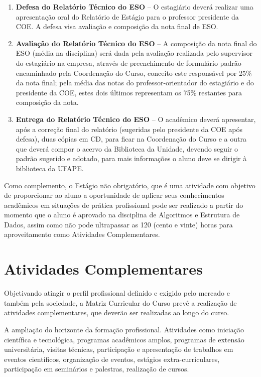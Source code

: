 \documentclass[
	12pt,				%
	openright,			%
  oneside,     %
	a4paper,			%
	english,			%
	french,				%
	spanish,			%
	brazil				%
	]{abntex2}
\begin{document}
\begin{enumerate}
    \item \textbf{Defesa do Relatório Técnico do ESO} – O estagiário deverá realizar uma apresentação oral do Relatório de Estágio para o professor presidente da COE. A defesa visa avaliação e composição da nota final de ESO.
    \item \textbf{Avaliação do Relatório Técnico do ESO} – A composição da nota final do ESO (média na disciplina) será dada pela avaliação realizada pelo supervisor do estagiário na empresa, através de preenchimento de formulário padrão encaminhado pela Coordenação do Curso, conceito este responsável por 25\% da nota final; pela média das notas do professor-orientador do estagiário e do presidente da COE, estes dois últimos representam os 75\% restantes para composição da nota.
    \item \textbf{Entrega do Relatório Técnico do ESO} – O acadêmico deverá apresentar, após a correção final do relatório (sugeridas pelo presidente da COE após defesa), duas cópias em CD, para ficar na Coordenação do Curso e a outra que deverá compor o acervo da Biblioteca da Unidade, devendo seguir o padrão sugerido e adotado, para mais informações o aluno deve se dirigir à biblioteca da UFAPE.
\end{enumerate}

Como complemento, o Estágio não obrigatório, que é uma atividade com objetivo de proporcionar ao aluno a oportunidade de aplicar seus conhecimentos acadêmicos em situações de prática profissional pode ser realizado a partir do momento que o aluno é aprovado na disciplina de Algoritmos e Estrutura de Dados, assim como não pode ultrapassar as 120 (cento e vinte) horas para aproveitamento como Atividades Complementares.

\section{Atividades Complementares}

Objetivando atingir o perfil profissional definido e exigido pelo mercado e
também pela sociedade, a Matriz Curricular do Curso prevê a realização de
atividades complementares, que deverão ser realizadas ao longo do curso. 

A ampliação do horizonte da formação profissional. Atividades como iniciação
científica e tecnológica, programas acadêmicos amplos, programas de extensão
universitária, visitas técnicas, participação e apresentação de trabalhos em
eventos científicos, organização de eventos, estágios extra-curriculares,
participação em seminários e palestras, realização de cursos.
\end{document}

